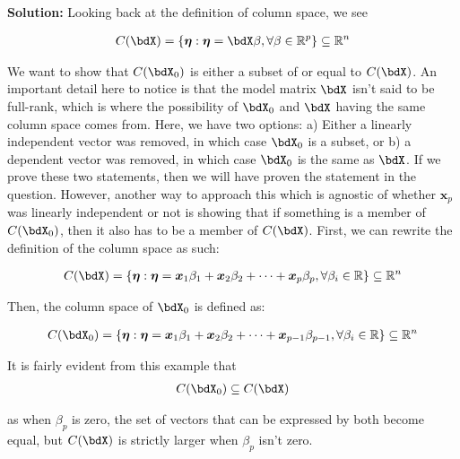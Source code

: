 \begin{enumerate}
\begin{hwanswer}
	\textbf{Solution:} Looking back at the definition of column space, we see 

\begin{align*}
	C(\bdX) = \{\bm \eta : \bm \eta = \bdX \beta, \forall \beta \in \mathbb R^p\} \subseteq \mathbb R^n
\end{align*}

We want to show that $C(\bdX_0)$ is either a subset of or equal to $C(\bdX)$. An important detail here to notice is that the model matrix $\bdX$ isn't said to be full-rank, which is where the possibility of $\bdX_0$ and $\bdX$ having the same column space comes from. Here, we have two options: 
a) Either a linearly independent vector was removed, in which case $\bdX_0$ is a subset, or b) a dependent vector was removed, in which case $\bdX_0$ is the same as $\bdX$. If we prove these two statements, then we will have proven the statement in the question. However, another way to approach this which is agnostic of whether $\bm x_p$ was linearly independent or not is showing that if something is a member of $C(\bdX_0)$, then it also has to be a member of $C(\bdX)$. First, we can rewrite the definition of the column space as such: 

\begin{align*}
	C(\bdX) = \{\bm \eta : \bm \eta = \bm x_1 \beta_1 + \bm x_2 \beta_2 + \dots + \bm x_p \beta_p, \forall \beta_i \in \mathbb R\} \subseteq \mathbb R^n
\end{align*}

Then, the column space of $\bdX_0$ is defined as:

\begin{align*}
	C(\bdX_0) = \{\bm \eta : \bm \eta = \bm x_1 \beta_1 + \bm x_2 \beta_2 + \dots + \bm x_{p-1} \beta_{p-1}, \forall \beta_i \in \mathbb R\} \subseteq \mathbb R^n
\end{align*}

It is fairly evident from this example that 
\begin{align*}
	C(\bdX_0) \subseteq C(\bdX)
\end{align*}

as when $\beta_p$ is zero, the set of vectors that can be expressed by both become equal, but $C(\bdX)$ is strictly larger when $\beta_p$ isn't zero. 


\end{hwanswer}
\end{enumerate}
